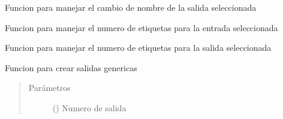 \documentclass[letterpaper,10pt,spanish]{sphinxmanual}
\begin{document}

\begin{fulllineitems}
\label{\detokenize{codigos/FuzzyHandler:FuzzyHandler.nombre_salida}}
Funcion para manejar el cambio de nombre de la salida seleccionada

\end{fulllineitems}


\begin{fulllineitems}
\label{\detokenize{codigos/FuzzyHandler:FuzzyHandler.numero_de_etiquetas_in}}
Funcion para manejar el numero de etiquetas para la entrada seleccionada

\end{fulllineitems}


\begin{fulllineitems}
\label{\detokenize{codigos/FuzzyHandler:FuzzyHandler.numero_de_etiquetas_out}}
Funcion para manejar el numero de etiquetas para la salida seleccionada

\end{fulllineitems}


\begin{fulllineitems}
\label{\detokenize{codigos/FuzzyHandler:FuzzyHandler.outputDic_creator}}
Funcion para crear salidas genericas
\begin{quote}\begin{description}
\item[{Parámetros}] \leavevmode
{} () \textendash{} Numero de salida

\end{description}\end{quote}

\end{fulllineitems}
\end{document}
